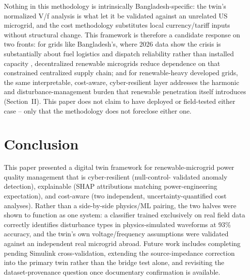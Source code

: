\documentclass[conference,a4paper]{IEEEtran}
\begin{document}
Nothing in this methodology is intrinsically Bangladesh-specific: the
twin's normalized V/f analysis is what let it be validated against an
unrelated US microgrid, and the cost methodology substitutes local
currency/tariff inputs without structural change. This framework is
therefore a candidate response on two fronts: for grids like
Bangladesh's, where 2026 data show the crisis is substantially about
fuel logistics and dispatch reliability rather than installed
capacity \cite{dailystar2026pdbplan,dailystar2026rooppur},
decentralized renewable microgrids reduce dependence on that
constrained centralized supply chain; and for renewable-heavy
developed grids, the same interpretable, cost-aware, cyber-resilient
layer addresses the harmonic and disturbance-management burden that
renewable penetration itself introduces (Section~II). This paper does
not claim to have deployed or field-tested either case -- only that
the methodology does not foreclose either one.

\section{Conclusion}
This paper presented a digital twin framework for renewable-microgrid
power quality management that is cyber-resilient (null-control-
validated anomaly detection), explainable (SHAP attributions matching
power-engineering expectation), and cost-aware (two independent,
uncertainty-quantified cost analyses). Rather than a side-by-side
physics/ML pairing, the two halves were shown to function as one
system: a classifier trained exclusively on real field data correctly
identifies disturbance types in physics-simulated waveforms at 93\%
accuracy, and the twin's own voltage/frequency assumptions were
validated against an independent real microgrid abroad. Future work
includes completing pending Simulink cross-validation, extending the
source-impedance correction into the primary twin rather than the
bridge test alone, and revisiting the dataset-provenance question
once documentary confirmation is available.
\end{document}
